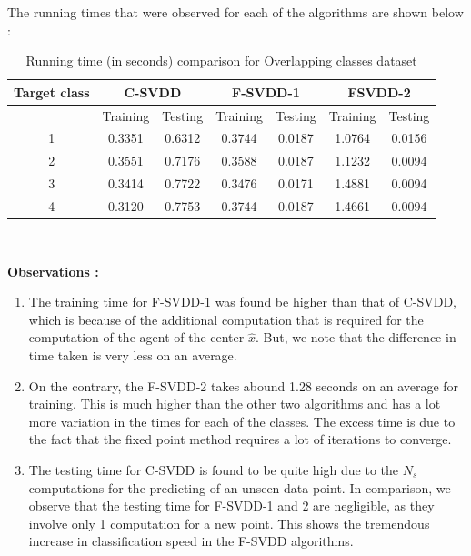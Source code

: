 \documentclass{article} %
\begin{document}
The running times that were observed for each of the algorithms are shown below : 
\begin{table}[H]
\begin{center}
\caption{Running time (in seconds) comparison for Overlapping classes dataset}
\begin{tabular}{|c|c|c|c|c|c|c|}
\hline
Target class & \multicolumn{2}{|c|}{C-SVDD} & \multicolumn{2}{|c|}{F-SVDD-1} & \multicolumn{2}{|c|}{FSVDD-2}  \\ \hline
& Training & Testing & Training & Testing & Training & Testing \\ \hline
1 & 0.3351 & 0.6312 & 0.3744  & 0.0187 & 1.0764 & 0.0156 \\ \hline
2 & 0.3551 & 0.7176 & 0.3588 & 0.0187 & 1.1232 & 0.0094 \\ \hline
3 & 0.3414 & 0.7722 & 0.3476 & 0.0171 & 1.4881 & 0.0094 \\ \hline
4 & 0.3120 & 0.7753 & 0.3744 & 0.0187 & 1.4661 &  0.0094 \\ \hline

\end{tabular} \\[5pt]
\end{center}
\end{table}


\textbf{Observations :}
\begin{enumerate}
\item The training time for F-SVDD-1 was found be higher than that of C-SVDD, which is because of the additional computation that is required for the computation of the agent of the center $\hat{x}$. But, we note that the difference in time taken is very less on an average.

\item On the contrary, the F-SVDD-2 takes abound 1.28 seconds on an average for training. This is much higher than the other two algorithms and has a lot more variation in the times for each of the classes. The excess time is due to the fact that the fixed point method requires a lot of iterations to converge.

\item The testing time for C-SVDD is found to be quite high due to the $N_s$ computations for the predicting of an unseen data point. In comparison, we observe that the testing time for F-SVDD-1 and 2 are negligible, as they involve only 1 computation for a new point. This shows the tremendous increase in classification speed in the F-SVDD algorithms.
\end{enumerate}
\end{document}
